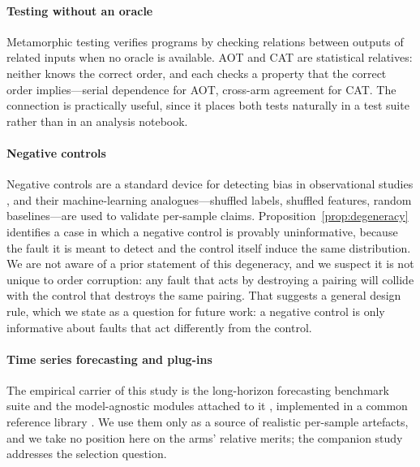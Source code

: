 \documentclass[a4paper,fleqn]{cas-sc}
\begin{document}
\paragraph{Testing without an oracle}
Metamorphic testing \citep{segura2016,chen2018metamorphic} verifies programs by
checking relations between outputs of related inputs when no oracle is available.
AOT and CAT are statistical relatives: neither knows the correct order, and each
checks a property that the correct order implies---serial dependence for AOT,
cross-arm agreement for CAT. The connection is practically useful, since it places
both tests naturally in a test suite rather than in an analysis notebook.

\paragraph{Negative controls}
Negative controls are a standard device for detecting bias in observational studies
\citep{lipsitch2010}, and their machine-learning analogues---shuffled labels,
shuffled features, random baselines---are used to validate per-sample claims.
Proposition~\ref{prop:degeneracy} identifies a case in which a negative control is
provably uninformative, because the fault it is meant to detect and the control
itself induce the same distribution. We are not aware of a prior statement of this
degeneracy, and we suspect it is not unique to order corruption: any fault that
acts by destroying a pairing will collide with the control that destroys the same
pairing. That suggests a general design rule, which we state as a question for
future work: a negative control is only informative about faults that act
differently from the control.

\paragraph{Time series forecasting and plug-ins}
The empirical carrier of this study is the long-horizon forecasting benchmark
suite \citep{zhou2021informer,wu2021autoformer,zeng2023dlinear,nie2023patchtst,liu2024itransformer}
and the model-agnostic modules attached to it
\citep{kim2022revin,liu2023san,wang2024fredf}, implemented in a common reference
library \citep{tslib,wu2023timesnet}. We use them only as a source of realistic
per-sample artefacts, and we take no position here on the arms' relative merits;
the companion study \citep{companion2026} addresses the selection question.

\end{document}
